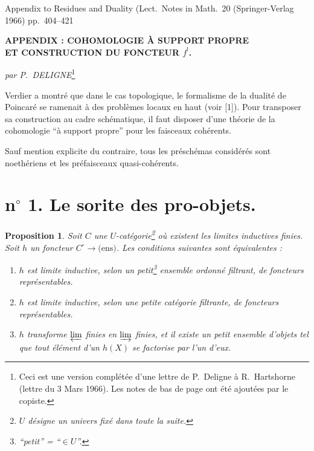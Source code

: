 \documentclass[12pt]{amsart}
\theoremstyle{plain}
\newtheorem{prop}{Proposition}
\theoremstyle{definition}
\begin{document}
\begin{center}
Appendix to Residues and Duality (Lect.\ Notes in Math.\ 20 (Springer-Verlag 1966) pp.\ 404--421
\end{center}

\bigskip

\begin{center}
\textbf{APPENDIX : COHOMOLOGIE \`A SUPPORT PROPRE}\\[4pt]
\textbf{ET CONSTRUCTION DU FONCTEUR $f^{!}$.}
\end{center}

\medskip

\begin{center}
\textit{par P.\ DELIGNE}\footnote{Ceci est une version compl\'et\'ee d'une lettre de P.\ Deligne \`a R.\ Hartshorne (lettre du 3 Mars 1966). Les notes de bas de page ont \'et\'e ajout\'ees par le copiste.}
\end{center}

\bigskip

Verdier a montr\'e que dans le cas topologique, le formalisme de la dualit\'e de Poincar\'e se ramenait \`a des probl\`emes locaux en haut (voir [1]). Pour transposer sa construction au cadre sch\'ematique, il faut disposer d'une th\'eorie de la cohomologie ``\`a support propre'' pour les faisceaux coh\'erents.

Sauf mention explicite du contraire, tous les pr\'esch\'emas consid\'er\'es sont noeth\'eriens et les pr\'efaisceaux quasi-coh\'erents.

\section*{n$^{\circ}$ 1. Le sorite des pro-objets.}

\begin{prop}
Soit $C$ une $U$-cat\'egorie\footnote{$U$ d\'esigne un univers fix\'e dans toute la suite.} o\`u existent les limites inductives finies. Soit $h$ un foncteur $C^{\circ} \to \text{(ens)}$. Les conditions suivantes sont \'equivalentes :
\begin{enumerate}
\item[(i)] $h$ est limite inductive, selon un petit\footnote{``petit'' = ``$\in U$''.} ensemble ordonn\'e filtrant, de foncteurs repr\'esentables.
\item[(ii)] $h$ est limite inductive, selon une petite cat\'egorie filtrante, de foncteurs repr\'esentables.
\item[(iii)] $h$ transforme $\varprojlim$ finies en $\varinjlim$ finies, et il existe un petit ensemble d'objets tel que tout \'el\'ement d'un $h(X)$ se factorise par l'un d'eux.
\end{enumerate}
\end{prop}
\end{document}
